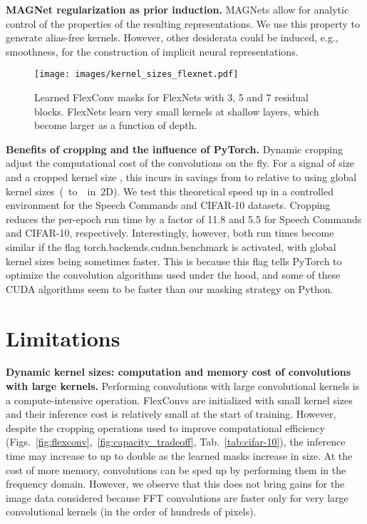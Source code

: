 \documentclass{article} \usepackage{iclr2022_conference,times}
\begin{document}
\textbf{MAGNet regularization as prior induction.} MAGNets allow for analytic control of the properties of the resulting representations. We use this property to generate alias-free kernels. However, other desiderata could be induced, e.g., smoothness, for the construction of implicit neural representations. 
\begin{figure}[t]
    \centering
    \texttt{[image: images/kernel\_sizes\_flexnet.pdf]}
    \vspace{-8mm}
    \caption{Learned FlexConv masks for FlexNets with 3, 5 and 7 residual blocks. FlexNets learn very small kernels at shallow layers, which become larger as a function of depth.
    \vspace{-4mm}}
    \label{fig:c10-kernels}
\end{figure}

\textbf{Benefits of cropping and the influence of {\btt PyTorch}.} Dynamic cropping adjust the computational cost of the convolutions on the fly. For a signal of size  and a cropped kernel size , this incurs in savings from  to  relative to using global kernel sizes~(~to~~in~2D).
We test this theoretical speed up in a controlled environment for the Speech Commands and CIFAR-10 datasets. Cropping reduces the per-epoch run time by a factor of 11.8 and 5.5 for Speech Commands and CIFAR-10, respectively. Interestingly, however, both run times become similar if the flag {\btt torch.backends.cudnn.benchmark} is activated, with global kernel sizes being sometimes faster. This is because this flag tells {\btt PyTorch} to optimize the convolution algorithms used under the hood, and some of these CUDA algorithms seem to be faster than our masking strategy on {\btt Python}.
\vspace{-2mm}
\section{Limitations}
\label{sec:limitations}
\vspace{-2mm}
\textbf{Dynamic kernel sizes: computation and memory cost of convolutions with large kernels.} Performing convolutions with large convolutional kernels is a compute-intensive operation. FlexConvs are initialized with small kernel sizes and their inference cost is relatively small at the start of training. However, despite the cropping operations used to improve computational efficiency (Figs.~\ref{fig:flexconv},~\ref{fig:capacity_tradeoff}, Tab.~\ref{tab:cifar-10}), the inference time may increase to up to double as the learned masks increase in size. At the cost of more memory, convolutions can be sped up by performing them in the frequency domain. However, we observe that this does not bring gains for the image data considered because FFT convolutions are faster only for very large convolutional kernels (in the order of hundreds of pixels).
\end{document}
